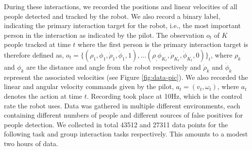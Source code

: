 \documentclass[letterpaper, 10 pt, conference]{ieeeconf}
\begin{document}
During these interactions, we recorded the positions and linear velocities of all people detected and tracked by the robot. We also record a binary label, indicating the primary interaction target for the robot, i.e., the most important person in the interaction as indicated by the pilot. The observation $o_t$ of $K$ people tracked at time $t$ where the first person is the primary interaction target is therefore defined as, $o_t = \{(\rho_1,\phi_1,\dot{\rho}_1,\dot{\phi}_1,1),... (\rho_,\phi_{K_t},\dot{\rho}_{K_t},\dot{\phi}_{K_t},0)\}_t$, where $\rho_k$ and $\phi_k$ are the distance and angle from the robot respectively and $\dot{\rho}_k$ and $\dot{\phi}_k$ represent the associated velocities (see Figure \ref{fig:data-pic}). We also recorded the linear and angular velocity commands given by the pilot, $a_t = (v_t,\omega_t)$, where $a_t$ denotes the action at time $t$. Recording took place at 10Hz, which is the control rate the robot uses. Data was gathered in multiple different environments, each containing different numbers of people and different sources of false positives for people detection. We collected in total 43512 and 27311 data points for the following task and group interaction tasks respectively. This amounts to a modest two hours of data.
\end{document}
